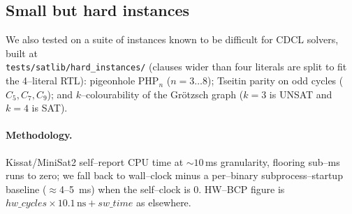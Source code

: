 \documentclass[11pt,letterpaper]{article}
\begin{document}
\subsection{Small but hard instances}\label{sec:hard}
We also tested on a suite of instances known to be difficult for CDCL solvers,
built at \\ \texttt{tests/satlib/hard\_instances/} (clauses wider than four
literals are split to fit the 4--literal RTL):
pigeonhole PHP$_n$ ($n{=}3{\ldots}8$); Tseitin parity on odd cycles
($C_5,C_7,C_9$); and $k$--colourability of the Grötzsch graph
($k{=}3$ is UNSAT and $k{=}4$ is SAT).

\paragraph{Methodology.} Kissat/MiniSat2 self--report CPU time at
$\sim$$10$\,ms granularity, flooring sub--ms runs to zero; we fall
back to wall--clock minus a per--binary subprocess--startup baseline
($\approx$4--5~ms) when the self--clock is $0$. HW--BCP figure is
$hw\_cycles \times 10.1\,\mathrm{ns} + sw\_time$ as elsewhere.
\end{document}

